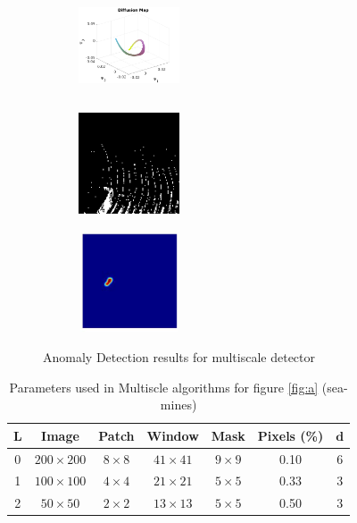 \begin{figure}[t!]
\medskip
\begin{subfigure}{0.32\textwidth}
\includegraphics[height=3cm,width=3cm]{./Figures/field/3.png}
\caption{}
\end{subfigure}\hspace*{\fill}
\begin{subfigure}{0.32\textwidth}
\includegraphics[height=3cm,width=3cm]{./Figures/field/5.png}
\caption{} 
\end{subfigure}
\begin{subfigure}{0.32\textwidth}
\includegraphics[height=3cm,width=3cm]{./Figures/field/6.png}
\caption{} 
\end{subfigure}

\caption{Anomaly Detection results for multiscale detector} \label{R:field}
\end{figure}

\begin{table}
\caption{Parameters used in Multiscle algorithms for figure \ref{fig:a} (sea-mines)}
\begin{center}
 \begin{tabular}{c c c c c c c} 
  \hline\hline 
 $\mathbf{L}$ & Image & Patch & Window & Mask & Pixels (\%) & $\mathbf{d}$\\ [0.5ex]   
 \hline
 0 & $200\times200$ & $8\times8$ & $41\times41$ & $9\times9$ & 0.10 & 6 \\ 
 
 1 & $100\times100$ & $4\times4$ & $21\times21$ & $5\times5$ & 0.33 & 3 \\
 
 2 & $50\times50$ & $2\times2$ & $13\times13$ & $5\times5$ & 0.50 & 3 \\ [1ex] 
\hline
\end{tabular}
\end{center}
\label{T:sea}
\end{table}

